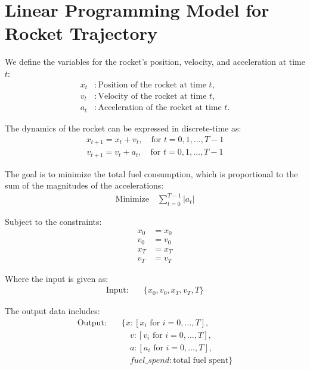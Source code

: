 \documentclass{article}
\begin{document}
\section*{Linear Programming Model for Rocket Trajectory}

We define the variables for the rocket's position, velocity, and acceleration at time \( t \):
\begin{align*}
x_t & : \text{Position of the rocket at time } t, \\
v_t & : \text{Velocity of the rocket at time } t, \\
a_t & : \text{Acceleration of the rocket at time } t.
\end{align*}

The dynamics of the rocket can be expressed in discrete-time as:
\begin{align}
x_{t+1} = x_t + v_t, \quad \text{for } t = 0, 1, \ldots, T-1 \tag{1}
\end{align}
\begin{align}
v_{t+1} = v_t + a_t, \quad \text{for } t = 0, 1, \ldots, T-1 \tag{2}
\end{align}

The goal is to minimize the total fuel consumption, which is proportional to the sum of the magnitudes of the accelerations:
\begin{align}
\text{Minimize} \quad \sum_{t=0}^{T-1} |a_t| \tag{3}
\end{align}

Subject to the constraints:
\begin{align}
x_0 & = x_0 \tag{4} \\
v_0 & = v_0 \tag{5} \\
x_T & = x_T \tag{6} \\
v_T & = v_T \tag{7}
\end{align}

Where the input is given as:
\begin{align*}
\text{Input:} \quad & \{ x_0, v_0, x_T, v_T, T \}
\end{align*}

The output data includes:
\begin{align*}
\text{Output:} \quad & \{ x: [x_i \text{ for } i = 0, \ldots, T], \\
                      & \quad v: [v_i \text{ for } i = 0, \ldots, T], \\
                      & \quad a: [a_i \text{ for } i = 0, \ldots, T], \\
                      & \quad fuel\_spend: \text{total fuel spent} \}
\end{align*}
\end{document}
